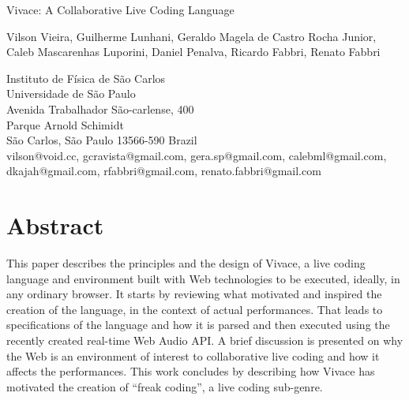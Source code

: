 \documentclass[letterpaper, 12pt]{article}
\begin{document}
 {\cmjTitle Vivace: A Collaborative Live Coding Language}

{\cmjAuthor Vilson Vieira, Guilherme Lunhani, Geraldo Magela de Castro
  Rocha Junior, Caleb Mascarenhas Luporini, Daniel Penalva, Ricardo
  Fabbri, Renato Fabbri
\newline
\begin{cmjAuthorAddress}
  Instituto de F\'{i}sica de S\~{a}o Carlos\\
  Universidade de S\~{a}o Paulo\\
  Avenida Trabalhador S\~{a}o-carlense, 400\\
  Parque Arnold Schimidt\\
  S\~{a}o Carlos, S\~{a}o Paulo 13566-590 Brazil\\

  vilson@void.cc, gcravista@gmail.com, gera.sp@gmail.com,
  calebml@gmail.com, dkajah@gmail.com, rfabbri@gmail.com,
  renato.fabbri@gmail.com
\end{cmjAuthorAddress}

\vspace*{24pt}

\section*{Abstract}

This paper describes the principles and the design of Vivace, a live
coding language and environment built with Web technologies to be
executed, ideally, in any ordinary browser. It starts by reviewing
what motivated and inspired the creation of the language, in the
context of actual performances. That leads to specifications of the
language and how it is parsed and then executed using the recently
created real-time Web Audio API. A brief discussion is presented on
why the Web is an environment of interest to collaborative live coding
and how it affects the performances. This work concludes by describing
how Vivace has motivated the creation of ``freak coding'', a live
coding sub-genre.

\section*{} %

}
\end{document}
